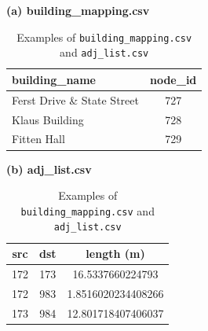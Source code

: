 \documentclass[fleqn,10pt]{olplainarticle}
\begin{document}



\begin{table}[h]
\centering
\begin{minipage}[t]{0.45\textwidth}
\centering
\textbf{(a) building\_mapping.csv}\\[4pt]
\begin{tabular}{l c}
\hline
\textbf{building\_name} & \textbf{node\_id} \\
\hline
Ferst Drive \& State Street & 727 \\
Klaus Building & 728 \\
Fitten Hall & 729 \\
\hline
\end{tabular}
\end{minipage}
\hfill
\begin{minipage}[t]{0.45\textwidth}
\centering
\textbf{(b) adj\_list.csv}\\[4pt]
\begin{tabular}{c c c}
\hline
\textbf{src} & \textbf{dst} & \textbf{length (m)} \\
\hline
172 & 173 & 16.5337660224793 \\
172 & 983 & 1.8516020234408266 \\
173 & 984 & 12.801718407406037 \\
\hline
\end{tabular}
\end{minipage}
\caption[b]{Examples of \texttt{building\_mapping.csv} and \texttt{adj\_list.csv}}
\end{table}
\end{document}
